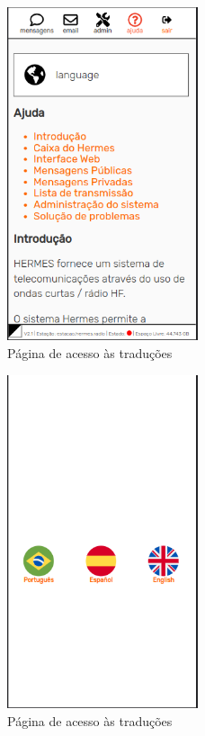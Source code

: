 \documentclass[11pt,a4paper]{article}
\begin{document}

\begin{figure}[H]
    \centering
    \includegraphics[width=0.5\textwidth]{screenshots/frontend/pt_kn/languages.png}
    \caption{Página de acesso às traduções}
	\vspace{-10pt}
    \label{fig:languages}
\end{figure}

\begin{figure}[H]
    \centering
    \includegraphics[width=0.5\textwidth]{screenshots/frontend/pt_kn/languages2.png}
    \caption{Página de acesso às traduções}
	\vspace{-10pt}
    \label{fig:languages2}
\end{figure}
\end{document}
